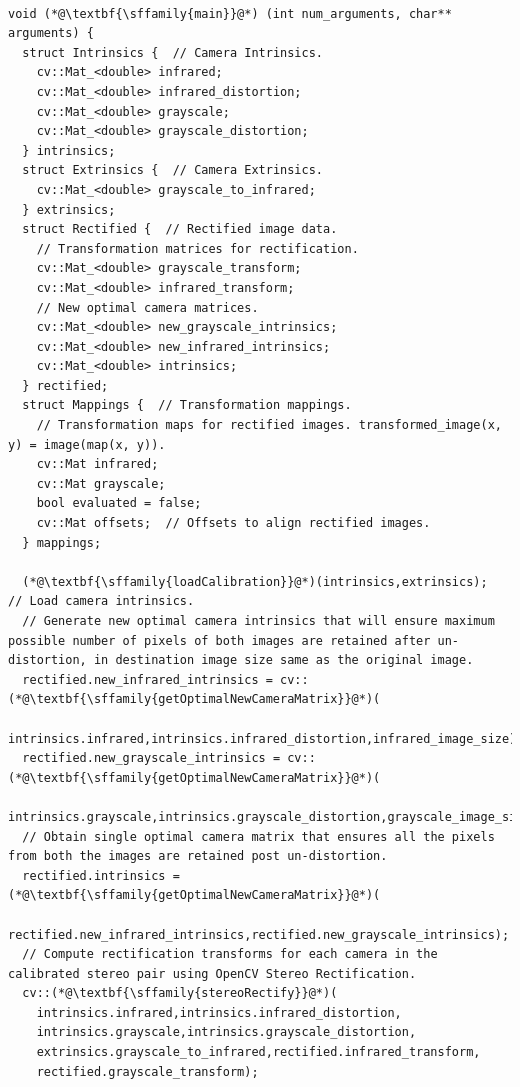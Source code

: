 \documentclass[runningheads]{llncs}
\begin{document}
\begin{lstlisting}[caption=Pseudo-code for Image fusion, label=pseudo, frame=single]

void (*@\textbf{\sffamily{main}}@*) (int num_arguments, char** arguments) {
  struct Intrinsics {  // Camera Intrinsics.
    cv::Mat_<double> infrared;
    cv::Mat_<double> infrared_distortion;
    cv::Mat_<double> grayscale;
    cv::Mat_<double> grayscale_distortion;
  } intrinsics;
  struct Extrinsics {  // Camera Extrinsics.
    cv::Mat_<double> grayscale_to_infrared;
  } extrinsics;
  struct Rectified {  // Rectified image data.
    // Transformation matrices for rectification.
    cv::Mat_<double> grayscale_transform;
    cv::Mat_<double> infrared_transform;
    // New optimal camera matrices.
    cv::Mat_<double> new_grayscale_intrinsics; 
    cv::Mat_<double> new_infrared_intrinsics;
    cv::Mat_<double> intrinsics;
  } rectified;
  struct Mappings {  // Transformation mappings.
    // Transformation maps for rectified images. transformed_image(x, y) = image(map(x, y)).
    cv::Mat infrared;
    cv::Mat grayscale;
    bool evaluated = false;
    cv::Mat offsets;  // Offsets to align rectified images.
  } mappings;

  (*@\textbf{\sffamily{loadCalibration}}@*)(intrinsics,extrinsics);  // Load camera intrinsics.
  // Generate new optimal camera intrinsics that will ensure maximum possible number of pixels of both images are retained after un-distortion, in destination image size same as the original image.
  rectified.new_infrared_intrinsics = cv::(*@\textbf{\sffamily{getOptimalNewCameraMatrix}}@*)(
    intrinsics.infrared,intrinsics.infrared_distortion,infrared_image_size);
  rectified.new_grayscale_intrinsics = cv::(*@\textbf{\sffamily{getOptimalNewCameraMatrix}}@*)(
    intrinsics.grayscale,intrinsics.grayscale_distortion,grayscale_image_size);
  // Obtain single optimal camera matrix that ensures all the pixels from both the images are retained post un-distortion.
  rectified.intrinsics = (*@\textbf{\sffamily{getOptimalNewCameraMatrix}}@*)(
    rectified.new_infrared_intrinsics,rectified.new_grayscale_intrinsics);
  // Compute rectification transforms for each camera in the calibrated stereo pair using OpenCV Stereo Rectification.
  cv::(*@\textbf{\sffamily{stereoRectify}}@*)(
    intrinsics.infrared,intrinsics.infrared_distortion,
    intrinsics.grayscale,intrinsics.grayscale_distortion,
    extrinsics.grayscale_to_infrared,rectified.infrared_transform,
    rectified.grayscale_transform);


\end{lstlisting}
\end{document}
